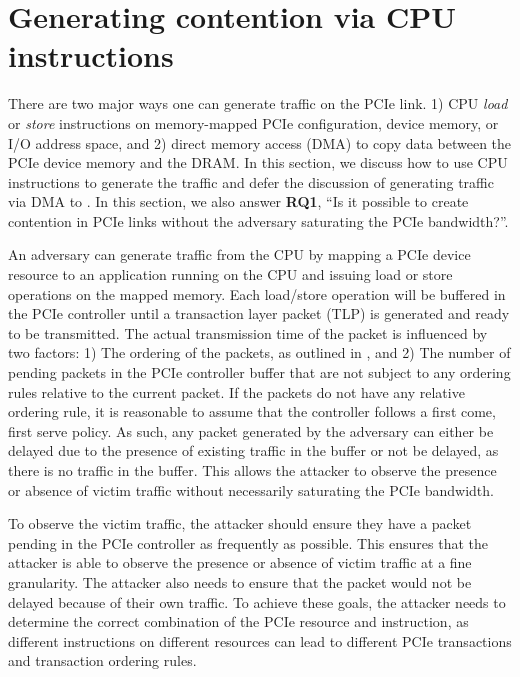 \section{Generating contention via CPU instructions}
\label{sec:interconnect-sc-store-ops}

There are two major ways one can generate traffic on the PCIe link.
1) CPU \textit{load} or \textit{store} instructions on memory-mapped PCIe configuration, device memory, or I/O address space, and 
2) direct memory access (DMA) to copy data between the PCIe device memory and the DRAM.
In this section, we discuss how to use CPU instructions to generate the traffic and defer the discussion of generating traffic via DMA to .
In this section, we also answer \textbf{RQ1}, ``Is it possible to create contention in PCIe links without the adversary saturating the PCIe bandwidth?''.

An adversary can generate traffic from the CPU by mapping a PCIe device resource to an application running on the CPU and issuing load or store operations on the mapped memory.
Each load/store operation will be buffered in the PCIe controller until a transaction layer packet (TLP) is generated and ready to be transmitted.
The actual transmission time of the packet is influenced by two factors:
1) The ordering of the packets, as outlined in , and
2) The number of pending packets in the PCIe controller buffer that are not subject to any ordering rules relative to the current packet.
If the packets do not have any relative ordering rule, it is reasonable to assume that the controller follows a first come, first serve policy.
As such, any packet generated by the adversary can either be delayed due to the presence of existing traffic in the buffer or not be delayed, as there is no traffic in the buffer.
This allows the attacker to observe the presence or absence of victim traffic without necessarily saturating the PCIe bandwidth.

To observe the victim traffic, the attacker should ensure they have a packet pending in the PCIe controller as frequently as possible.
This ensures that the attacker is able to observe the presence or absence of victim traffic at a fine granularity.
The attacker also needs to ensure that the packet would not be delayed because of their own traffic.
To achieve these goals, the attacker needs to determine the correct combination of the PCIe resource and instruction, as different instructions on different resources can lead to different PCIe transactions and transaction ordering rules.




% 
 